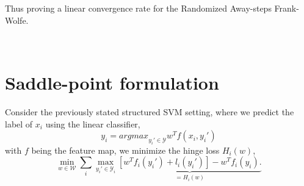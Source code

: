 \documentclass{article}
\begin{document}
Thus proving a linear convergence rate for the Randomized Away-steps Frank-Wolfe.
\begin{algorithm}[tb]
   \caption{Randomized Away-steps Frank-Wolfe}
   \label{alg:example}
\begin{algorithmic}
    \\
    \ENDFOR
\end{algorithmic}
\end{algorithm}
\section{Saddle-point formulation}
Consider the previously stated structured SVM setting, where we predict the label of $x_{i}$ using the linear classifier,
\begin{equation}
   y_i = \textit{argmax}_{ y_i' \in \mathcal{Y}}  w^T  f( x_i, y_i')
  \label{eq1}
\end{equation}
with $f$ being the feature map, we minimize the hinge loss $H_{i}( w)$,
\begin{equation}
  \min_{ w \in \mathcal{W}} \sum_i \max_{ y_i' \in \mathcal{Y}_i} \underbrace{\left[
 w^T  f_i( y_i') + l_i( y_i') \right] -  w^T  f_i(
y_i).}_{=H_{i}( w)}
\end{equation}
\end{document}
